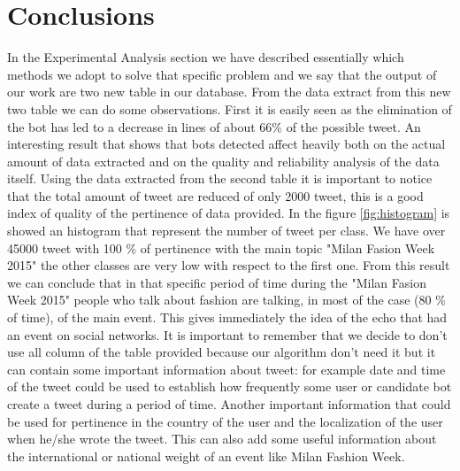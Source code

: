 \documentclass[conference, onecolumn]{IEEEtran}
\begin{document}
\section{Conclusions}\label{sec:conclusions}
In the Experimental Analysis section we have described essentially which methods we adopt to solve that specific problem and we say that the output of our work are two new table in our database. From the data extract from this new two table we can do some observations. First it is easily seen as the elimination of the bot has led to a decrease in lines of about 66\% of the possible tweet. An interesting result that shows that bots detected affect heavily both on the actual amount of data extracted and on the quality and reliability analysis of the data itself. Using the data extracted from the second table it is important to notice that the total amount of tweet are reduced of only 2000 tweet, this is a good index of quality of the pertinence of data provided. In the figure \ref{fig:histogram} is showed an histogram that represent the number of tweet per class. We have over 45000 tweet with 100 \% of pertinence with the main topic "Milan Fasion Week 2015" the other classes are very low with respect to the first one. From this result we can conclude that in that specific period of time during the "Milan Fasion Week 2015" people who talk about fashion are talking, in most of the case (80 \% of time), of the main event. This gives immediately the idea of the echo that had an event on social networks.
\medskip
It is important to remember that we decide to don't use all column of the table provided because our algorithm don't need it but it can contain some important information about tweet: for example date and time of the tweet could be used to establish how frequently some user or candidate bot create a tweet during a period of time. Another important information that could be used for pertinence in the country of the user and the localization of the user when he/she wrote the tweet. This can also add some useful information about the international or national weight of an event like Milan Fashion Week.
\medskip
\end{document}
